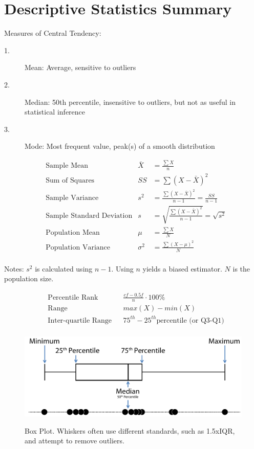 \documentclass{tufte-handout}
\begin{document}
\section{Descriptive Statistics Summary}

\begin{fullwidth}
Measures of Central Tendency:	
\begin{description}
\item[1.] Mean: Average, sensitive to outliers
\item[2.] Median: 50th percentile, insensitive to outliers, but not as useful in statistical inference
\item[3.] Mode: Most frequent value, peak(s) of a smooth distribution
\end{description}
\end{fullwidth}

\begin{align*}
&\text{Sample Mean} & \bar{X}&=\frac{\sum X}{n}\\
&\text{Sum of Squares} & SS&=\sum (X-\bar{X})^2\\
&\text{Sample Variance} & s^2&=\frac{\sum (X-\bar{X})^2}{n-1} = \frac{SS}{n-1}\\
&\text{Sample Standard Deviation} & s&=\sqrt{\frac{\sum (X-\bar{X})^2}{n-1}}=\sqrt{s^2}\\
&\text{Population Mean} & \mu&=\frac{\sum X}{N}\\
&\text{Population Variance} & \sigma^2&=\frac{\sum (X-\mu)^2}{N}\\
\end{align*}

\begin{fullwidth}
Notes: $s^2$ is calculated using $n-1$. Using $n$ yields a biased estimator. $N$ is the population size.
\end{fullwidth}

\begin{align*} 
&\text{Percentile Rank} & &\frac{cf-0.5f}{n} \cdot 100 \% \\
&\text{Range} & &max(X)-min(X)\\
&\text{Inter-quartile Range} & &75^{th}-25^{th} \text{percentile (or Q3-Q1)}\\
\end{align*}

\begin{figure}%
  \includegraphics[width=\linewidth]{handout1_boxplot}%
  \label{fig:fullfig}%
  \caption{Box Plot. Whiskers often use different standards, such as 1.5xIQR, and attempt to remove outliers.}
\end{figure}
\end{document}
